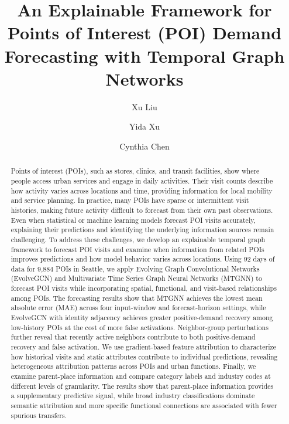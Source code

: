 \documentclass[preprint,authoryear,11pt]{elsarticle}
\date{}
\def\corref#1{}%
\theoremstyle{definition}
\begin{document}
\begin{frontmatter}

\title{An Explainable Framework for Points of Interest (POI) Demand Forecasting with Temporal Graph Networks}

\author[a]{Xu Liu}

\author[b]{Yida Xu\corref{cor1}}

\author[c]{Cynthia Chen}


\address[a]{Department of Statistics, University of Washington,
Seattle, WA 98195, USA}
\address[b]{Department of Industrial and Systems Engineering,
University of Washington, Seattle, WA 98195, USA}
\address[c]{Department of Civil and Environmental Engineering,
University of Washington, Seattle, WA 98195, USA}


\begin{abstract}
Points of interest (POIs), such as stores, clinics, and transit facilities, show where people access urban services and engage in daily activities.
Their visit counts describe how activity varies across locations and time, providing information for local mobility and service planning.
In practice, many POIs have sparse or intermittent visit histories, making future activity difficult to forecast from their own past observations.
Even when statistical or machine learning models forecast POI visits accurately, explaining their predictions and identifying the underlying information sources remain challenging.
To address these challenges, we develop an explainable temporal graph framework to forecast POI visits and examine when information from related POIs improves predictions and how model behavior varies across locations.
Using 92 days of data for 9,884 POIs in Seattle, we apply Evolving Graph Convolutional Networks (EvolveGCN) and Multivariate Time Series Graph Neural Networks (MTGNN) to forecast POI visits while incorporating spatial, functional, and visit-based relationships among POIs.
The forecasting results show that MTGNN achieves the lowest mean absolute error (MAE) across four input-window and forecast-horizon settings, while EvolveGCN with identity adjacency achieves greater positive-demand recovery among low-history POIs at the cost of more false activations.
Neighbor-group perturbations further reveal that recently active neighbors contribute to both positive-demand recovery and false activation.
We use gradient-based feature attribution to characterize how historical visits and static attributes contribute to individual predictions, revealing heterogeneous attribution patterns across POIs and urban functions.
Finally, we examine parent-place information and compare category labels and industry codes at different levels of granularity.
The results show that parent-place information provides a supplementary predictive signal, while broad industry classifications dominate semantic attribution and more specific functional connections are associated with fewer spurious transfers.
\end{abstract}


\end{frontmatter}
\end{document}
